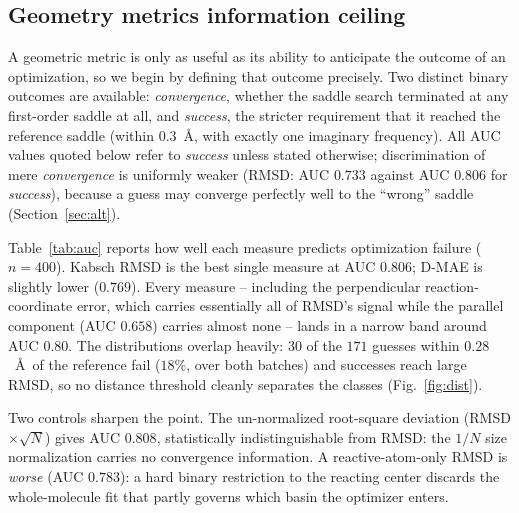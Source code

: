 \documentclass[11pt]{article}
\begin{document}
\subsection{Geometry metrics information ceiling}
\label{sec:ceiling}
A geometric metric is only as useful as its ability to anticipate the outcome of
an optimization, so we begin by defining that outcome precisely.
Two distinct binary outcomes are available: \textit{convergence}, whether the
saddle search terminated at any
first-order saddle at all, and \textit{success}, the stricter requirement that it
reached the reference saddle (within $0.3$~\AA, with exactly one imaginary
frequency). All AUC values quoted
below refer to \textit{success} unless stated otherwise; discrimination of mere
\textit{convergence} is uniformly weaker (RMSD: AUC $0.733$ against AUC $0.806$ for
\textit{success}),
because a guess may converge perfectly well to the ``wrong'' saddle
(Section~\ref{sec:alt}).

Table~\ref{tab:auc} reports how well each measure predicts optimization failure
($n=400$). Kabsch RMSD is the best single measure at AUC $0.806$; D-MAE is
slightly lower ($0.769$). Every measure -- including the perpendicular
reaction-coordinate error, which carries essentially all of RMSD's signal while
the parallel component (AUC $0.658$) carries almost none -- lands in a narrow
band around AUC $0.80$. The distributions overlap heavily: $30$ of the $171$
guesses within $0.28$~\AA\ of the reference fail ($18\%$, over both batches) and
successes reach large RMSD, so no distance threshold cleanly separates the
classes (Fig.~\ref{fig:dist}).

Two controls sharpen the point. The un-normalized root-square deviation (RMSD
$\times\sqrt{N}$) gives AUC $0.808$, statistically indistinguishable from RMSD:
the $1/N$ size normalization carries no convergence information. A
reactive-atom-only RMSD is \emph{worse} (AUC $0.783$): a hard binary restriction to
the reacting center discards the whole-molecule fit that partly governs which
basin the optimizer enters.
\end{document}
